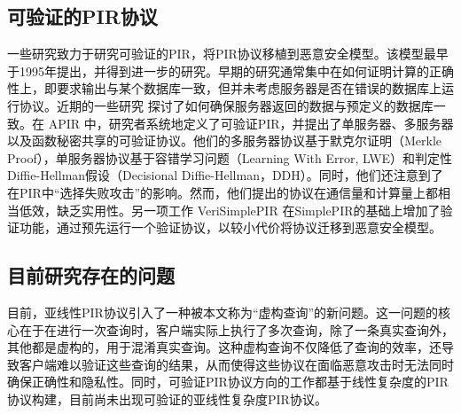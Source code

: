 \subsection{可验证的PIR协议}

一些研究致力于研究可验证的PIR，将PIR协议移植到恶意安全模型。该模型最早于1995年提出\cite{FOCS:CGKS95}，并得到进一步的研究\cite{SCN:BeiSta02, USENIX:DevGolHen12,SVPIR18, MerkleTree}。早期的研究通常集中在如何证明计算的正确性上，即要求输出与某个数据库一致，但并未考虑服务器是否在错误的数据库上运行协议。近期的一些研究 \cite{VeriSimplePIR, APIR} 探讨了如何确保服务器返回的数据与预定义的数据库一致。在 APIR\cite{APIR} 中，研究者系统地定义了可验证PIR，并提出了单服务器、多服务器以及函数秘密共享的可验证协议。他们的多服务器协议基于默克尔证明（Merkle Proof），单服务器协议基于容错学习问题（Learning With Error, LWE）和判定性Diffie-Hellman假设（Decisional Diffie-Hellman，DDH）。同时，他们还注意到了在PIR中“选择失败攻击”的影响。然而，他们提出的协议在通信量和计算量上都相当低效，缺乏实用性。另一项工作 VeriSimplePIR \cite{VeriSimplePIR} 在SimplePIR的基础上增加了验证功能，通过预先运行一个验证协议，以较小代价将协议迁移到恶意安全模型。

\subsection{目前研究存在的问题}
目前，亚线性PIR协议引入了一种被本文称为“虚构查询”的新问题。这一问题的核心在于在进行一次查询时，客户端实际上执行了多次查询，除了一条真实查询外，其他都是虚构的，用于混淆真实查询。这种虚构查询不仅降低了查询的效率，还导致客户端难以验证这些查询的结果，从而使得这些协议在面临恶意攻击时无法同时确保正确性和隐私性。同时，可验证PIR协议方向的工作都基于线性复杂度的PIR协议构建，目前尚未出现可验证的亚线性复杂度PIR协议。
